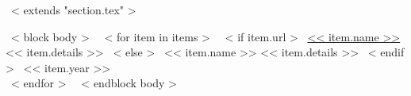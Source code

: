 ~< extends "section.tex" >~

~< block body >~
~< for item in items >~
  ~< if item.url >~
    \href{<< item.url >>}{<< item.name >>} << item.details >>
  ~< else >~
    << item.name >> << item.details >>
  ~< endif >~
  \hfill << item.year >> \\
~< endfor >~
~< endblock body >~
